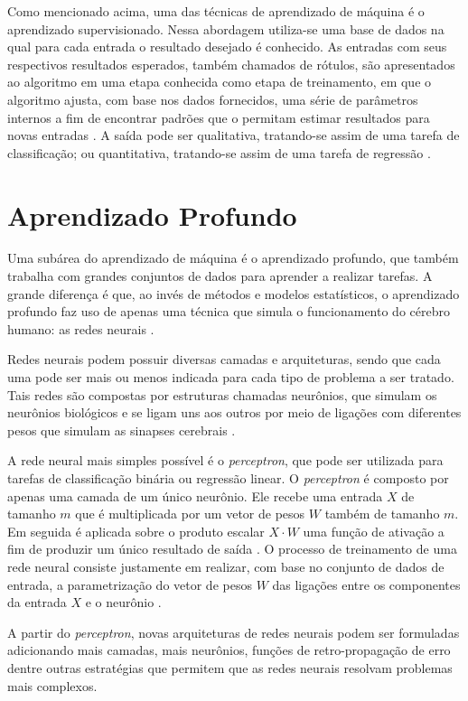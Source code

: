 Como mencionado acima, uma das técnicas de aprendizado de máquina é o aprendizado supervisionado. Nessa abordagem utiliza-se uma base de dados na qual para cada entrada o resultado desejado é conhecido. As entradas com seus respectivos resultados esperados, também chamados de rótulos, são apresentados ao algoritmo em uma etapa conhecida como etapa de treinamento, em que o algoritmo ajusta, com base nos dados fornecidos, uma série de parâmetros internos a fim de encontrar padrões que o permitam estimar resultados para novas entradas \cite{monard2003conceitos}. A saída pode ser qualitativa, tratando-se assim de uma tarefa de classificação; ou quantitativa, tratando-se assim de uma tarefa de regressão \cite{mueller2019deep}.

\section{Aprendizado Profundo}

Uma subárea do aprendizado de máquina é o aprendizado profundo, que também trabalha com grandes conjuntos de dados para aprender a realizar tarefas. A grande diferença é que, ao invés de métodos e modelos estatísticos, o aprendizado profundo faz uso de apenas uma técnica que simula o funcionamento do cérebro humano: as redes neurais \cite{mueller2019deep}. 

Redes neurais podem possuir diversas camadas e arquiteturas, sendo que cada uma pode ser mais ou menos indicada para cada tipo de problema a ser tratado.
Tais redes são compostas por estruturas chamadas neurônios, que simulam os neurônios biológicos e se ligam uns aos outros por meio de ligações com diferentes pesos que simulam as sinapses cerebrais \cite{mueller2019deep}.

A rede neural mais simples possível é o \textit{perceptron}, que pode ser utilizada para tarefas de classificação binária ou regressão linear. O \textit{perceptron} é composto por apenas uma camada de um único neurônio. Ele recebe uma entrada $X$ de tamanho $m$ que é multiplicada por um vetor de pesos $W$ também de tamanho $m$. Em seguida é aplicada sobre o produto escalar $X \cdot W$ uma função de ativação a fim de produzir um único resultado de saída \cite{block1962perceptron}. O processo de treinamento de uma rede neural consiste justamente em realizar, com base no conjunto de dados de entrada, a parametrização do vetor de pesos $W$ das ligações entre os componentes da entrada $X$ e o neurônio \cite{mueller2019deep}.

A partir do \textit{perceptron}, novas arquiteturas de redes neurais podem ser formuladas adicionando mais camadas, mais neurônios, funções de retro-propagação de erro dentre outras estratégias que permitem que as redes neurais resolvam problemas mais complexos.


